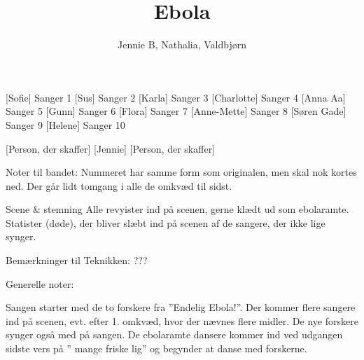 \documentclass[a4paper,11pt]{article}
\title{Ebola}
\author{Jennie B, Nathalia, Valdbjørn}
\begin{document}
\maketitle

\begin{roles}
    [Sofie] Sanger 1
    [Sus] Sanger 2
    [Karla] Sanger 3
    [Charlotte] Sanger 4
    [Anna Aa] Sanger 5
    [Gunn] Sanger 6
    [Flora] Sanger 7
    [Anne-Mette] Sanger 8
    [Søren Gade] Sanger 9
    [Helene] Sanger 10
\end{roles}

\begin{props}
    [Person, der skaffer]
    [Jennie]
    [Person, der skaffer]
\end{props}

\scene
Noter til bandet:
Nummeret har samme form som originalen, men skal nok kortes ned. Der går lidt tomgang i alle de omkvæd til sidst.

Scene \& stemning
Alle revyister ind på scenen, gerne klædt ud som ebolaramte.
Statister (døde), der bliver slæbt ind på scenen af de sangere, der ikke lige synger.

Bemærkninger til Teknikken:
???

Generelle noter:

Sangen starter med de to forskere fra ”Endelig Ebola!”. Der kommer flere sangere ind på scenen, evt. efter 1. omkvæd, hvor der nævnes flere midler. De nye forskere synger også med på sangen.
De ebolaramte dansere kommer ind ved udgangen sidste vers på ” mange friske lig” og begynder at danse med forskerne.
\end{document}
